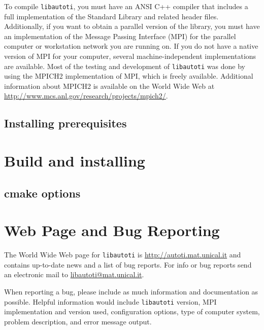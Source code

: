 To compile \verb"libautoti", you must have an ANSI C++ compiler
that includes a full implementation of the Standard Library and
related header files. Additionally, if you want to obtain a
parallel version of the library, you must have an implementation
of the Message Passing Interface (MPI) for the parallel computer
or workstation network you are running on. If you do not have a
native version of MPI for your computer, several
machine-independent implementations are available. Most of the
testing and development of \verb"libautoti" was done by using the
MPICH2 implementation of MPI, which is freely available.
Additional information about MPICH2 is available on the World Wide
Web at \url{http://www.mcs.anl.gov/research/projects/mpich2/}.

\subsection{Installing prerequisites}


\section{Build and installing}

\subsection{cmake options}




\section{Web Page and Bug Reporting}

The World Wide Web page for \verb"libautoti" is
\url{http://autoti.mat.unical.it} and contains up-to-date news and
a list of bug reports. For info or bug reports send an electronic
mail to
\href{mailto:libautoti@mat.unical.it}{libautoti@mat.unical.it}.

When reporting a bug, please include as much information and
documentation as possible. Helpful information would include
\verb"libautoti" version, MPI implementation and version used,
configuration options, type of computer system, problem
description, and error message output.
